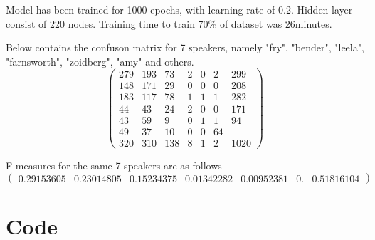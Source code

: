 \documentclass[BTech]{srmuthesis}
\begin{document}
Model has been trained for 1000 epochs, with learning rate of 0.2. Hidden layer consist of 220 nodes. Training time to train 70\% of dataset was 26minutes.


Below contains the confuson matrix for 7 speakers, namely "fry", "bender", "leela", "farnsworth", "zoidberg", "amy" and others. 
$$\begin{pmatrix}
279&193&73&2&0&2&299\\
148&171&29&0&0&0&208\\
183&117&78&1&1&1&282\\
44&43&24&2&0&0&171\\
43&59&9&0 &1&1&94\\
49&37&10&0& 0&64\\
320&310&138&8&1&2&1020
\end{pmatrix}$$

F-measures for the same 7 speakers are as follows
$$\begin{pmatrix}
0.29153605&0.23014805&0.15234375 &0.01342282&0.00952381&0.&0.51816104
\end{pmatrix}$$


\section{Code}
\end{document}

